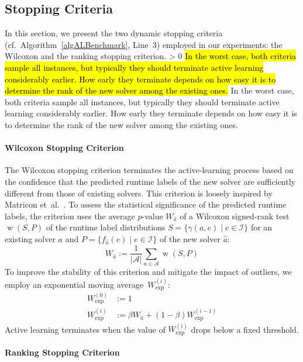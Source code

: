 \documentclass[sn-basic, Numbered]{sn-jnl} %
\newcommand{\showchanges}{1} %
\newcommand{\change}[1]{\ifnum \showchanges > 0 \sethlcolor{yellow}\hl{#1} \else #1 \fi}
\begin{document}
\subsection{Stopping Criteria}
\label{sec:main:stopping}

In this section, we present the two dynamic stopping criteria (cf.~Algorithm~\ref{algALBenchmark}, Line~3) employed in our experiments: the Wilcoxon and the ranking stopping criterion.
\change{
In the worst case, both criteria sample all instances, but typically they should terminate active learning considerably earlier.
How early they terminate depends on how easy it is to determine the rank of the new solver among the existing ones.
}

\paragraph{Wilcoxon Stopping Criterion}

The Wilcoxon stopping criterion terminates the active-learning process based on the confidence that the predicted runtime labels of the new solver are sufficiently different from those of existing solvers.
This criterion is loosely inspired by Matricon et~al.~\cite{MatriconAFSH21}.
To assess the statistical significance of the predicted runtime labels, the criterion uses the average $p$-value $W_{\hat{a}}$ of a Wilcoxon signed-rank test $\operatorname{w}(S,P)$ of the runtime label distributions ${S=\{ \gamma(a, e) \mid e \in \mathcal{I} \}}$ for an existing solver $a$ and \mbox{$P=\{ f_{\hat a}(e) \mid e \in \mathcal{I} \}$} of the new solver $\hat{a}$:
%
\begin{equation*}
  W_{\hat{a}} := \frac{1}{\lvert \mathcal{A} \rvert} \sum_{a \in \mathcal{A}} \operatorname{w}(S, P)
\end{equation*}
%
To improve the stability of this criterion and mitigate the impact of outliers, we employ an exponential moving average~$W^{(i)}_{\exp}$:
%
\begin{align*}
  W_{\exp}^{\left(0\right)} &:= 1\\
  W_{\exp}^{\left(i\right)} &:= \beta W_{\hat{a}} + \left(1 - \beta\right) W_{\exp}^{\left(i - 1\right)}
\end{align*}
%
Active learning terminates when the value of $W^{(i)}_{\exp}$ drops below a fixed threshold.

\paragraph{Ranking Stopping Criterion}
\end{document}
